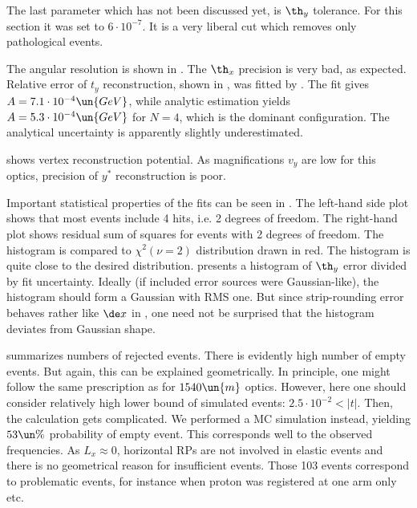 
The last parameter which has not been discussed yet, is $\th_y$ tolerance. For this section it was set to $6\cdot10^{-7}$. It is a very liberal cut which removes only pathological events.


\break\hbox{}
\kern-1.6cm

The angular resolution is shown in . The $\th_x$ precision is very bad, as expected. Relative error of $t_y$ reconstruction, shown in , was fitted by . The fit gives $A = 7.1\cdot10^{-4}\un{GeV}$, while analytic estimation yields $A = 5.3\cdot10^{-4}\un{GeV}$ for $N = 4$, which is the dominant configuration. The analytical uncertainty is apparently slightly underestimated.

 shows vertex reconstruction potential. As magnifications $v_y$ are low for this optics, precision of $y^*$ reconstruction is poor.

Important statistical properties of the fits can be seen in . The left-hand side plot shows that most events include 4 hits, i.e. 2 degrees of freedom. The right-hand plot shows residual sum of squares for events with 2 degrees of freedom. The histogram is compared to $\chi^2(\nu = 2)$ distribution drawn in red. The histogram is quite close to the desired distribution.  presents a histogram of $\th_y$ error divided by fit uncertainty. Ideally (if included error sources were Gaussian-like), the histogram should form a Gaussian with RMS one. But since strip-rounding error behaves rather like $\de x$ in , one need not be surprised that the histogram deviates from Gaussian shape.

 summarizes numbers of rejected events. There is evidently high number of empty events. But again, this can be explained geometrically. In principle, one might follow the same prescription as for $1540\un{m}$ optics. However, here one should consider relatively high lower bound of simulated events: $2.5\cdot10^{-2} < |t|$. Then, the calculation gets complicated. We performed a MC simulation instead, yielding $53\un{\%}$ probability of empty event. This corresponds well to the observed frequencies. As $L_x\approx 0$, horizontal RPs are not involved in elastic events and there is no geometrical reason for insufficient events. Those 103 events correspond to problematic events, for instance when proton was registered at one arm only etc.

